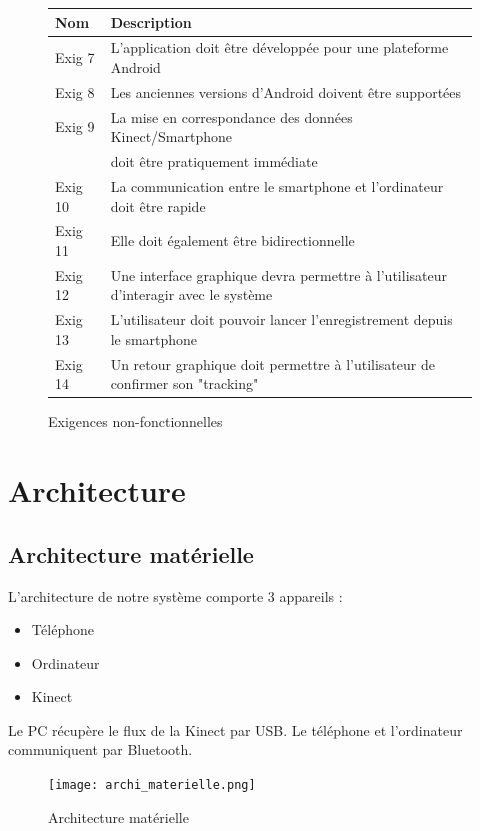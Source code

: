 \documentclass[12pt, french]{article}
\begin{document}
\begin{figure}
\begin{center}
\begin{tabular}{|l|l|}
  \hline
  Nom & Description \\
  \hline
  Exig 7 & L’application doit être développée pour une plateforme Android \\
  Exig 8 & Les anciennes versions d’Android doivent être supportées \\
  Exig 9 & La mise en correspondance des données Kinect/Smartphone \\
  		& doit être pratiquement immédiate \\
  Exig 10 & La communication entre le smartphone et l'ordinateur doit être rapide \\
  Exig 11 & Elle doit également être bidirectionnelle \\
  Exig 12 & Une interface graphique devra permettre à l'utilisateur d'interagir avec le système \\
  Exig 13 & L'utilisateur doit pouvoir lancer l'enregistrement depuis le smartphone \\
  Exig 14 & Un retour graphique doit permettre à l'utilisateur de confirmer son "tracking" \\
  \hline
\end{tabular}
\end{center}
\caption{Exigences non-fonctionnelles}
\end{figure}
\break

\section{Architecture}
\subsection{Architecture matérielle}

L'architecture de notre système comporte 3 appareils : 
\begin{itemize}
\item Téléphone 
\item Ordinateur 
\item Kinect
\end{itemize}

Le PC récupère le flux de la Kinect par USB. Le téléphone et l'ordinateur communiquent par Bluetooth.

\begin{figure}[H]
\centering
\texttt{[image: archi\_materielle.png]}
\caption{Architecture matérielle}
\label{fig11}
\end{figure}
\end{document}
